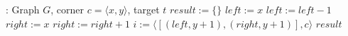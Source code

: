 \begin{algorithmic}
: Graph $G$, corner $c = \langle x,y\rangle$, target $t$
\STATE $result := \{\}$
\STATE $left := x$
  \STATE $left := left - 1$
\ENDWHILE
\STATE $right := x$
  \STATE $right := right + 1$
\ENDWHILE
\STATE $i := \langle [(left,y+1),(right,y+1)], c\rangle$
 $result$
\end{algorithmic}
